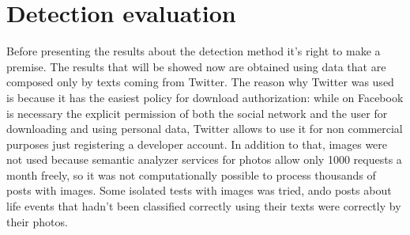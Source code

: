 \section{Detection evaluation}
\label{sec:detectioneva}
\noindent
\renewcommand\arraystretch{1.5}
\setlength\tabcolsep{0pt}
\begin{table}
\centering
{}
\quad
{}
\caption{Confusion matrices of boolean tests}
\end{table}
Before presenting the results about the detection method it's right to make a premise. The results that will be showed now are obtained using data that are composed only by texts coming from Twitter. The reason why Twitter was used is because it has the easiest policy for download authorization: while on Facebook is necessary the explicit permission of both the social network and the user for downloading and using personal data, Twitter allows to use it for non commercial purposes just registering a developer account. In addition to that, images were not used because semantic analyzer services for photos allow only 1000 requests a month freely, so it was not computationally possible to process thousands of posts with images. Some isolated tests with images was tried, ando posts about life events that hadn't been classified correctly using their texts were correctly by their photos.

